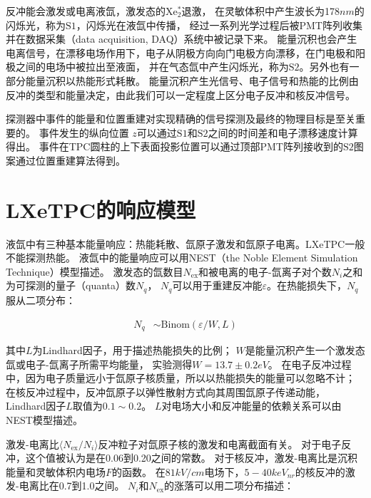 反冲能会激发或电离液氙，激发态的$\mathrm{Xe_2^*}$退激，
在灵敏体积中产生波长为178$\si{nm}$的闪烁光，称为$\mathrm{S1}$，闪烁光在液氙中传播，
经过一系列光学过程后被PMT阵列收集并在数据采集（data acquisition, DAQ）系统中被记录下来。
能量沉积也会产生电离信号，在漂移电场作用下，电子从阴极方向向门电极方向漂移，在门电极和阳极之间的电场中被拉出至液面，
并在气态氙中产生闪烁光，称为$\mathrm{S2}$。另外也有一部分能量沉积以热能形式耗散。
能量沉积产生光信号、电子信号和热能的比例由反冲的类型和能量决定，由此我们可以一定程度上区分电子反冲和核反冲信号。

探测器中事件的能量和位置重建对实现精确的信号探测及最终的物理目标是至关重要的。
事件发生的纵向位置 $z$可以通过$\mathrm{S1}$和$\mathrm{S2}$之间的时间差和电子漂移速度计算得出。
事件在TPC圆柱的上下表面投影位置可以通过顶部PMT阵列接收到的$\mathrm{S2}$图案通过位置重建算法得到。

\section{LXeTPC的响应模型}

液氙中有三种基本能量响应：热能耗散、氙原子激发和氙原子电离。LXeTPC一般不能探测热能。
液氙中的能量响应可以用NEST（the Noble Element Simulation Technique）模型描述\cite{szydagis_nest_2011,lenardo_global_2015}。
激发态的氙数目$N_{\mathrm{ex}}$和被电离的电子-氙离子对个数$N_i$之和为可探测的量子（quanta）数$N_q$，
$N_q$可以用于重建反冲能$\varepsilon $。在热能损失下，$N_q$服从二项分布：

\begin{align}
    \label{eq:N_q}
    N_q &\sim \mathrm{Binom}\left(\varepsilon /W,L\right)
\end{align}

其中$L$为Lindhard因子，用于描述热能损失的比例；
$W$是能量沉积产生一个激发态氙或电子-氙离子所需平均能量，
实验测得$W=13.7\pm0.2\si{eV}$\cite{szydagis_nest_2011}。
在电子反冲过程中，因为电子质量远小于氙原子核质量，所以以热能损失的能量可以忽略不计；
在核反冲过程中，反冲氙原子以弹性散射方式向其周围氙原子传递动能，Lindhard因子$L$取值为$0.1\sim0.2$。
$L$对电场大小和反冲能量的依赖关系可以由NEST模型描述。

激发-电离比$\langle N_{\mathrm{ex}}/N_i\rangle$反冲粒子对氙原子核的激发和电离截面有关。
对于电子反冲，这个值被认为是在0.06到0.20之间的常数。
对于核反冲，激发-电离比是沉积能量和灵敏体积内电场$F$的函数\cite{lenardo_global_2015}。
在$81\si{kV/cm}$电场下，$5-40\si{keV_{nr}}$的核反冲的激发-电离比在0.7到1.0之间。
$N_i$和$N_{\mathrm{ex}}$的涨落可以用二项分布描述：

